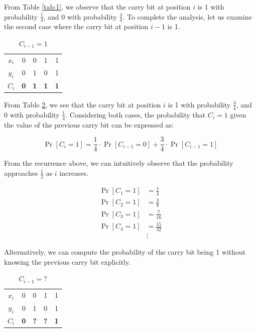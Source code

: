 \documentclass[runningheads]{llncs}
\begin{document}
From Table \ref{tab:1}, we observe that the carry bit at position \( i \) is 1 with probability \( \frac{1}{4} \), and 0 with probability \( \frac{3}{4} \). To complete the analysis, let us examine the second case where the carry bit at position \( i-1 \) is 1.

\begin{table}[h]
\centering
    \begin{tabular}{ c || c | c | c | c }
    $x_i$ & 0 & 0 & 1 & 1 \\ 
    $y_i$ & 0 & 1 & 0 & 1 \\ 
    \hline
    $C_i$ & \textbf{0} & \textbf{1} & \textbf{1} & \textbf{1}  
    \end{tabular}
    \caption{$C_{i-1} = 1$}
    \label{tab:2}
\end{table}

From Table \ref{tab:2}, we see that the carry bit at position \( i \) is 1 with probability \( \frac{3}{4} \), and 0 with probability \( \frac{1}{4} \). Considering both cases, the probability that \( C_i = 1 \) given the value of the previous carry bit can be expressed as:

\begin{center}
\[
\Pr[C_i = 1] = \frac{1}{4} \cdot \Pr[C_{i-1} = 0] + \frac{3}{4} \cdot \Pr[C_{i-1} = 1]
\]
\end{center}

From the recurrence above, we can intuitively observe that the probability approaches \( \frac{1}{2} \) as \( i \) increases.

\begin{center}
\begin{align*}
\Pr[C_1 = 1] &= \frac{1}{4} \\
\Pr[C_2 = 1] &= \frac{3}{8} \\
\Pr[C_3 = 1] &= \frac{7}{16} \\
\Pr[C_4 = 1] &= \frac{15}{32} \\
&\vdots
\end{align*}
\end{center}

Alternatively, we can compute the probability of the carry bit being 1 without knowing the previous carry bit explicitly.

\begin{table}[h]
\centering
    \begin{tabular}{ c || c | c | c | c }
    $x_i$ & 0 & 0 & 1 & 1 \\ 
    $y_i$ & 0 & 1 & 0 & 1 \\ 
    \hline
    $C_i$ & \textbf{0} & \textbf{?} & \textbf{?} & \textbf{1}  
    \end{tabular}
    \caption{$C_{i-1} = ?$}
    \label{tab:2}
\end{table}
\end{document}
